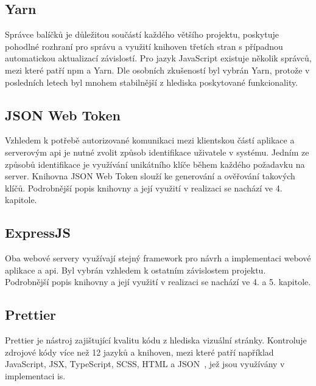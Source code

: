 \subsection{Yarn}
Správce balíčků je důležitou součástí každého většího projektu, poskytuje pohodlné rozhraní pro správu a využití knihoven třetích stran s případnou automatickou aktualizací závislostí. Pro jazyk JavaScript existuje několik správců, mezi které patří npm a Yarn. Dle osobních zkušeností byl vybrán Yarn, protože v posledních letech byl mnohem stabilnější z hlediska poskytované funkcionality.

\subsection{JSON Web Token}
Vzhledem k potřebě autorizované komunikaci mezi klientskou částí aplikace a serverovým \gls{api} je nutné zvolit způsob identifikace uživatele v systému. Jedním ze způsobů identifikace je využívání unikátního klíče během každého požadavku na server. Knihovna JSON Web Token slouží ke generování a ověřování takových klíčů. Podrobnější popis knihovny a její využití v realizaci se nachází ve 4. kapitole.

\subsection{ExpressJS}
Oba webové servery využívají stejný framework pro návrh a implementaci webové aplikace a \gls{api}. Byl vybrán vzhledem k ostatním závislostem projektu. Podrobnější popis knihovny a její využití v realizaci se nachází ve 4. a 5. kapitole.

\subsection{Prettier}
Prettier je nástroj zajištující kvalitu kódu z hlediska vizuální stránky. Kontroluje zdrojové kódy více než 12 jazyků a knihoven, mezi které patří například JavaScript, JSX, TypeScript, SCSS, HTML a JSON~\cite{prettier}, jež jsou využívány v implementaci \gls{is}.
